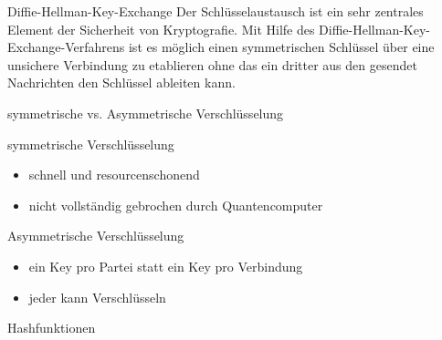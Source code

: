 \documentclass[10pt]{beamer}
\begin{document}
	\begin{frame}{Diffie-Hellman-Key-Exchange}
		Der Schlüsselaustausch ist ein sehr zentrales Element der Sicherheit von Kryptografie. Mit Hilfe des Diffie-Hellman-Key-Exchange-Verfahrens ist es möglich einen symmetrischen Schlüssel über eine unsichere Verbindung zu etablieren ohne das ein dritter aus den gesendet Nachrichten den Schlüssel ableiten kann.
	\end{frame}
	\begin{frame}{symmetrische vs. Asymmetrische Verschlüsselung}
		\begin{alertblock}{symmetrische Verschlüsselung}
			\begin{itemize}
				\item schnell und resourcenschonend
				\item nicht vollständig gebrochen durch Quantencomputer
			\end{itemize}
		\end{alertblock}
		\begin{alertblock}{Asymmetrische Verschlüsselung}
			\begin{itemize}
				\item ein Key pro Partei statt ein Key pro Verbindung
				\item jeder kann Verschlüsseln
			\end{itemize}
		\end{alertblock}
	\end{frame}

	\begin{frame}{Hashfunktionen}
	\end{frame}
\end{document}
